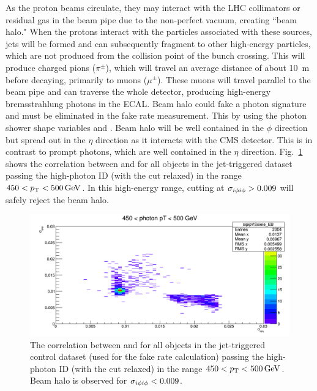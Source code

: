 As the proton beams circulate, they may interact with the LHC collimators or residual gas in the beam pipe due to the non-perfect vacuum, creating ``beam halo." When the protons interact with the particles associated with these sources, jets will be formed and can subsequently fragment to other high-energy particles, which are not produced from the collision point of the bunch crossing. This will produce charged pions ($\pi^{\pm}$), which will travel an average distance of about 10~m before decaying, primarily to muons ($\mu^{\pm}$). These muons will travel parallel to the beam pipe and can traverse the whole detector, producing high-energy bremsstrahlung photons in the ECAL. Beam halo could fake a photon signature and must be eliminated in the fake rate measurement. This  by using the photon shower shape variables \sieie and \sipip. Beam halo will be well contained in the $\phi$ direction but spread out in the $\eta$ direction as it interacts with the CMS detector. This is in contrast to prompt photons, which are well contained in the $\eta$ direction. Fig.~\ref{fig:sipip_vs_sieie} shows the correlation between \sieie and \sipip for all objects in the jet-triggered dataset passing the high-\pt photon ID (with the \sieie cut relaxed) in the range $450<p_{\mathrm{T}}<500\,\text{Ge\hspace{-.08em}V}$. In this high-energy range, cutting at $\sigma_{i\phi i\phi} > 0.009$ will safely reject the beam halo.

\begin{figure}[!htbp]
  \centering
  \includegraphics[scale=0.43]{figures/sipip_vs_sieie_EB_pT450-500.png}
  \caption{The correlation between \sieie and \sipip for all objects in the jet-triggered control dataset (used for the fake rate calculation) passing the high-\pt photon ID (with the \sieie cut relaxed) in the range $450<p_{\mathrm{T}}<500\,\text{Ge\hspace{-.08em}V}$. Beam halo is observed for $\sigma_{i\phi i\phi} < 0.009$.}
  \label{fig:sipip_vs_sieie}
\end{figure}

